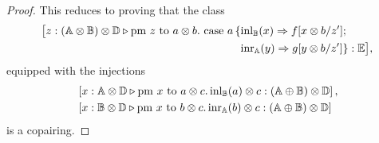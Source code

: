 \documentclass[10pt,a4paper]{amsart}
\theoremstyle{definition}
\theoremstyle{definition}
\theoremstyle{definition}
\theoremstyle{definition}
\theoremstyle{definition}
\theoremstyle{definition}
\begin{document}
\begin{proof}
This reduces to proving that the class
 \begin{align*}
    \big[z:(\mathbb{A} \otimes \mathbb{\mathbb{B}}) \otimes \mathbb{\mathbb{D}} \triangleright \text{pm } z \text{ to } a \otimes b. \text{ case } a\,\{ &\mathrm{inl}_{\mathbb{B}}(x) \Rightarrow f[x \otimes b/z']; \\
    & \mathrm{inr}_{\mathbb{A}}(y) \Rightarrow g [y \otimes b/z']\}: \mathbb{E} \big],
  \end{align*} 
equipped with the injections
 \begin{align*}
    & \left[ x: \mathbb{A} \otimes \mathbb{D} \triangleright\text{pm }x \text{ to } a\otimes c. \, \mathrm{inl}_{\mathbb{B}}(a) \otimes c : (\mathbb{A} \oplus \mathbb{B}) \otimes \mathbb{D}   \right],\\
    & \left[ x: \mathbb{B} \otimes \mathbb{D} \triangleright\text{pm }x \text{ to } b\otimes c. \, \mathrm{inr}_{\mathbb{A}}(b) \otimes c : (\mathbb{A} \oplus \mathbb{B}) \otimes \mathbb{D}   \right]
  \end{align*}
is a copairing.



\end{proof}
\end{document}
